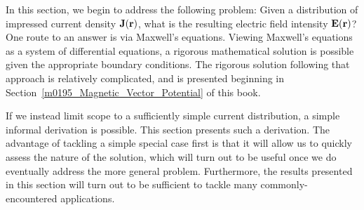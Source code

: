 

\label{m0194_Radiation_Current_Moment} %

In this section, we begin to address the following problem:  
Given a distribution of impressed current density ${\bf J}({\bf r})$, what is the resulting electric field intensity ${\bf E}({\bf r})$?
One route to an answer is via Maxwell's equations.
Viewing Maxwell's equations as a system of differential equations, a rigorous mathematical solution is possible given the appropriate boundary conditions.
The rigorous solution following that approach is relatively complicated, and is presented beginning in Section~\ref{m0195_Magnetic_Vector_Potential} of this book.

If we instead limit scope to a sufficiently simple current distribution, a simple informal derivation is possible.
This section presents such a derivation. 
The advantage of tackling a simple special case first is that it will allow us to quickly assess the nature of the solution, which will turn out to be useful once we do eventually address the more general problem.
Furthermore, the results presented in this section will turn out to be sufficient to tackle many commonly-encountered applications.

